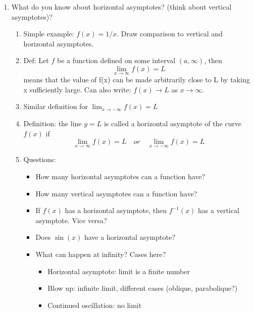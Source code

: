 \documentclass{article}
\begin{document}
\begin{enumerate}
\item What do you know about horizontal asymptotes? (think about vertical asymptotes)? 
\begin{enumerate}
\item Simple example: $f(x)=1/x$. Draw comparison to vertical and horizontal asymptotes.
\item Def: Let $f$ be a function defined on some interval $(a,\infty)$, then 
$$
\lim_{x\rightarrow \infty} f(x) = L
$$
means that the value of f(x) can be made arbitrarily close to L by taking x sufficiently large. Can also write: $f(x) \rightarrow L$ as $x\rightarrow \infty$.
\item Similar definition for $\lim_{x\rightarrow -\infty} f(x) = L$
\item Definition: the line $y=L$ is called a horizontal asymptote of the curve $f(x)$ if 
$$
\lim_{x\rightarrow \infty}f(x)=L \quad or \quad \lim_{x\rightarrow -\infty}f(x)=L
$$
\item Questions:
\begin{itemize}
\item How many horizontal asymptotes can a function have?
\item How many vertical asymptotes can a function have?
\item If $f(x)$ has a horizontal asymptote, then $f^{-1}(x)$ has a vertical asymptote. Vice versa?
\item Does $\sin(x)$ have a horizontal asymptote?
\item What can happen at infinity? Cases here?
\begin{itemize}
\item Horizontal asymptote: limit is a finite number
\item Blow up: infinite limit, different cases (oblique, parabolique?)
\item Continued oscillation: no limit
\end{itemize}
\end{itemize}
\end{enumerate}


\end{enumerate}
\end{document}
